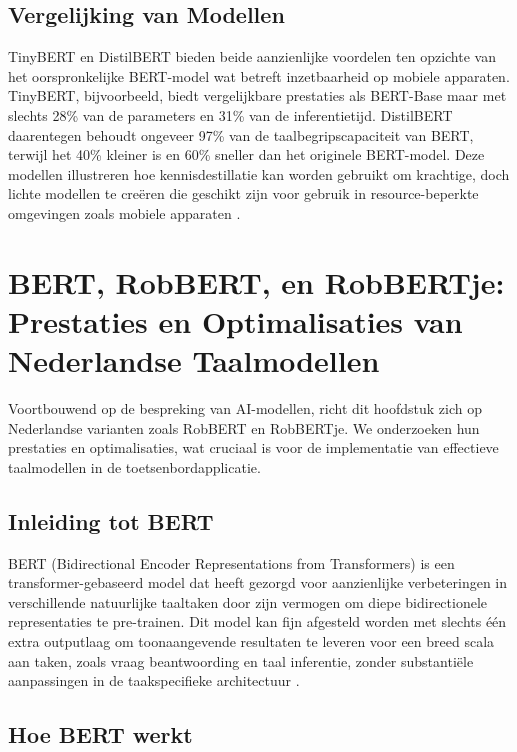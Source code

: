 \subsection{Vergelijking van Modellen}

TinyBERT en DistilBERT bieden beide aanzienlijke voordelen ten opzichte van het oorspronkelijke BERT-model wat betreft inzetbaarheid op mobiele apparaten. TinyBERT, bijvoorbeeld, biedt vergelijkbare prestaties als BERT-Base maar met slechts 28\% van de parameters en 31\% van de inferentietijd. DistilBERT daarentegen behoudt ongeveer 97\% van de taalbegripscapaciteit van BERT, terwijl het 40\% kleiner is en 60\% sneller dan het originele BERT-model. Deze modellen illustreren hoe kennisdestillatie kan worden gebruikt om krachtige, doch lichte modellen te creëren die geschikt zijn voor gebruik in resource-beperkte omgevingen zoals mobiele apparaten \autocite{Sanh2019DistilBERT}.


\section{BERT, RobBERT, en RobBERTje: Prestaties en Optimalisaties van Nederlandse Taalmodellen}

Voortbouwend op de bespreking van AI-modellen, richt dit hoofdstuk zich op Nederlandse varianten zoals RobBERT en RobBERTje. We onderzoeken hun prestaties en optimalisaties, wat cruciaal is voor de implementatie van effectieve taalmodellen in de toetsenbordapplicatie.

\subsection{Inleiding tot BERT}

BERT (Bidirectional Encoder Representations from Transformers) is een trans\-for\-mer-gebaseerd model dat heeft gezorgd voor aanzienlijke verbeteringen in verschillende natuurlijke taaltaken door zijn vermogen om diepe bidirectionele representaties te pre-trainen. Dit model kan fijn afgesteld worden met slechts één extra outputlaag om toonaangevende resultaten te leveren voor een breed scala aan taken, zoals vraag beantwoording en taal inferentie, zonder substantiële aanpassingen in de taakspecifieke architectuur \autocite{Devlin2019}.

\subsection{Hoe BERT werkt}

